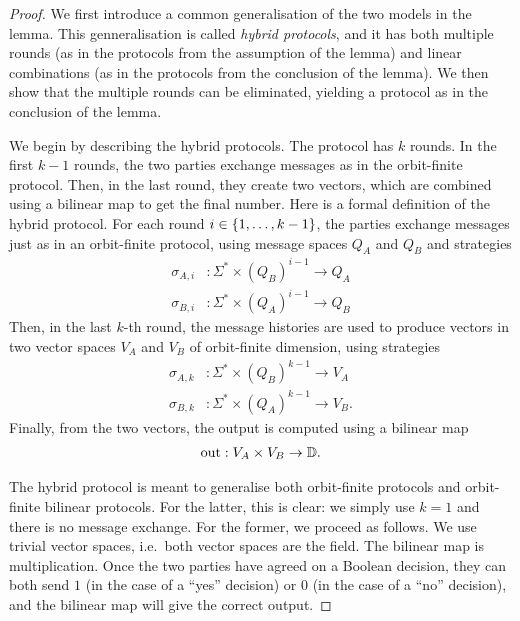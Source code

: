 \begin{theorem}
\begin{proof}
    We first introduce a common generalisation of the two models in the lemma. This genneralisation is called \emph{hybrid protocols}, and it has both multiple rounds (as in the protocols from the assumption of the lemma) and linear combinations (as in the protocols from the  conclusion of the lemma). We then show that the multiple rounds can be eliminated, yielding a protocol as in the conclusion of the lemma. 

    We begin by describing the hybrid protocols. The protocol has $k$ rounds.  In the first $k-1$ rounds, the two parties exchange messages as in the orbit-finite protocol. Then, in the last round, they create two vectors, which are combined using a bilinear map to get the final number. 
    Here is a formal definition of the hybrid protocol. For each round $i \in \{1,\ldots,k-1\}$, the parties exchange messages just as in an orbit-finite protocol, using message spaces $Q_A$ and $Q_B$ and strategies 
        \begin{align*}
        \sigma_{A,i} & : \Sigma^* \times (Q_B)^{i-1} \to Q_A\\
        \sigma_{B,i} & : \Sigma^* \times (Q_A)^{i-1} \to Q_B
        \end{align*}
    Then, in  the last $k$-th round, the message histories are used to produce vectors in two vector spaces $V_A$ and $V_B$ of orbit-finite dimension, using strategies 
    \begin{align*}
        \sigma_{A,k} & : \Sigma^* \times (Q_B)^{k-1} \to V_A\\
        \sigma_{B,k} & : \Sigma^* \times (Q_A)^{k-1} \to V_B.
        \end{align*}
    Finally, from the two vectors, the output is computed using a bilinear map
    \begin{align*}
        \text{out} : V_A \times V_B \to \mathbb D.
    \end{align*}
    

    The hybrid protocol is meant to generalise both orbit-finite protocols and orbit-finite bilinear protocols. For the latter, this is clear: we simply use $k=1$ and there is no message exchange. For the former, we proceed as follows. We use  trivial vector spaces, i.e.~both vector spaces are the field. The bilinear map is multiplication. Once the two parties have agreed on a Boolean decision, they can both send $1$ (in the case of a ``yes'' decision) or $0$ (in the case of a ``no'' decision), and the bilinear map will give the correct output. 
    

\end{proof}
\end{theorem}
